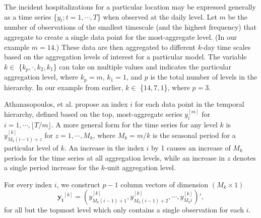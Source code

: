 \documentclass[12pt]{article}
\begin{document}
The incident hospitalizations for a particular location may be expressed generally as a time series \{$y_t; t = 1, \cdots, T$\} when observed at the daily level. Let $m$ be the number of observations of the smallest timescale (and the highest frequency) that aggregate to create a single data point for the most-aggregate level. (In our example $m = 14$.) These data are then aggregated to different $k$-day time scales based on the aggregation levels of interest for a particular model\cite{thief}. The variable $k \in$ \{$k_p,\cdot,k_2,k_1$\} can take on multiple values and indicates the particular aggregation level, where $k_p = m$, $k_1 = 1$, and $p$ is the total number of levels in the hierarchy\cite{thief}. In our example from earlier, $k \in$ \{$14, 7, 1$\}, where $p = 3$.

Athanasopoulos, et al. propose an index $i$ for each data point in the temporal hierarchy, defined based on the top, most-aggregate series $y_i^{[m]}$ for $i=1, \cdots, \lfloor T/m \rfloor$. A more general form for the time series for any level $k$ is $y_{M_k(i-1)+z}^{[k]}$ for $z = 1, \cdots, M_k$, where $M_k = m/k$ is the seasonal period for a particular level of $k$. An increase in the index $i$ by 1 causes an increase of $M_k$ periods for the time series at all aggregation levels, while an increase in $z$ denotes a single period increase for the $k$-unit aggregation level\cite{thief}.

For every index $i$, we construct $p-1$ column vectors of dimension $(M_k \times 1)$ \[\boldsymbol{y_i}^{[k]} = (y_{M_k(i-1)+1}^{[k]}, y_{M_k(i-1)+2}^{[k]}, \cdots, y_{M_ki}^{[k]})',\] for all but the topmost level which only contains a single observation for each $i$.
\end{document}
